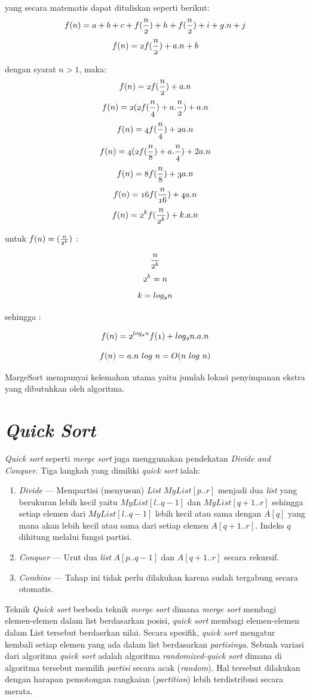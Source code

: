 \documentclass[12pt]{book}%
\begin{document}
yang secara matematis dapat dituliskan seperti berikut:
$$	  \mathnormal{f(n) = a+b+c+f(\frac{n}{2})+h+f(\frac{n}{2})+i+g.n+j } $$
$$	  \mathnormal{f(n) = 2f(\frac{n}{2})+a.n + b} $$

dengan syarat $n > 1$, maka:
$$	  \mathnormal{f(n) = 2f(\frac{n}{2})+a.n } $$
$$	  \mathnormal{f(n) = 2(2f(\frac{n}{4})+a.\frac{n}{2} )} + a.n $$
$$	  \mathnormal{f(n) = 4f(\frac{n}{4})+2a.n } $$
$$	  \mathnormal{f(n) = 4(2f(\frac{n}{8})+a.\frac{n}{4} )}+2a.n $$
$$	  \mathnormal{f(n) = 8f(\frac{n}{8})+3a.n } $$
$$	  \mathnormal{f(n) = 16f(\frac{n}{16})+4a.n } $$
$$	  \mathnormal{f(n) = 2^{k}f(\frac{n}{2^{k}})+k.a.n } $$

untuk $ \mathnormal{f(n) = (\frac{n}{2^{k}})} $ :

$$ \mathnormal{\frac{n}{2^{k}}} $$
$$ \mathnormal{2^{k}=n} $$
$$ \mathnormal{k=log_{2}n} $$

sehingga :

$$	  \mathnormal{f(n) = 2^{log_{2}n}f(1)+log_{2}n.a.n } $$

$$	  \mathnormal{f(n) = a.n\ log\ n = O(n\ log\ n)} $$

MargeSort mempunyai kelemahan utama yaitu jumlah lokasi penyimpanan ekstra yang dibutuhkan oleh algoritma.
 
\section{\textit{Quick Sort}}

\textit{Quick sort} seperti \textit{merge sort} juga menggunakan pendekatan \textit{Divide and Conquer}. Tiga langkah yang dimiliki \textit{quick sort} ialah:
\begin{enumerate}
	\item \textit{Divide} --- Mempartisi (menyusun) \textit{List} $MyList[p..r]$ menjadi dua \textit{list} yang berukuran lebih kecil yaitu $MyList[l..q-1]$ dan $MyList[q+1..r]$ sehingga setiap elemen dari $MyList[l..q-1]$ lebih kecil atau sama dengan $A[q]$ yang mana akan lebih kecil atau sama dari setiap elemen $A[q+1..r]$. Indeks $q$ dihitung melalui fungsi partisi.
	\item \textit{Conquer} --- Urut dua \textit{list} $A[p..q-1]$ dan $A[q+1..r]$ secara rekursif.
	\item \textit{Combine} --- Tahap ini tidak perlu dilakukan karena sudah tergabung secara otomatis.
\end{enumerate}

Teknik \textit{Quick sort} berbeda teknik \textit{merge sort} dimana \textit{merge sort} membagi elemen-elemen dalam list berdasarkan posisi, \textit{quick sort} membagi elemen-elemen dalam List tersebut berdasrkan nilai. Secara spesifik, \textit{quick sort} mengatur kembali setiap elemen yang ada dalam list berdasarkan \emph{partisinya}. Sebuah variasi dari algoritma \textit{quick sort} adalah algoritma \textit{randomized-quick sort} dimana di algoritma tersebut memilih \textit{partisi} secara acak (\textit{random}). Hal tersebut dilakukan dengan harapan pemotongan rangkaian (\textit{partition}) lebih terdistribusi secara merata.
\end{document}
